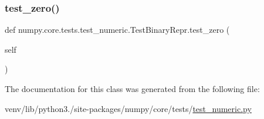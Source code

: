 \subsubsection{\texorpdfstring{test\+\_\+zero()}{test\_zero()}}
{\footnotesize\ttfamily def numpy.\+core.\+tests.\+test\+\_\+numeric.\+Test\+Binary\+Repr.\+test\+\_\+zero (\begin{DoxyParamCaption}\item[{}]{self }\end{DoxyParamCaption})}



The documentation for this class was generated from the following file\+:\begin{DoxyCompactItemize}
\item 
venv/lib/python3./site-\/packages/numpy/core/tests/\hyperlink{core_2tests_2test__numeric_8py}{test\+\_\+numeric.\+py}\end{DoxyCompactItemize}
